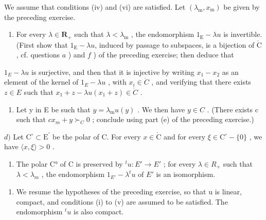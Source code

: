 We assume that conditions (iv) and (vi) are satisfied. Let \((\lambda_{\mathrm{m}}, x_{\mathrm{m}})\) be given by the preceding exercise.

\begin{enumerate}
\def\labelenumi{\alph{enumi})}
\setcounter{enumi}{1}
\tightlist
\item
  For every \(\lambda \in \mathbf{R}_{+}\) such that \(\lambda < \lambda_{\mathrm{m}}\) , the endomorphism \(1_{\mathrm{E}} - \lambda u\) is invertible. (First show that \(1_{\mathrm{E}} - \lambda u\), induced by passage to subspaces, is a bijection of \(\mathring{\mathrm{C}}\) , cf. questions \(a\) ) and \(f\) ) of the preceding exercise; then deduce that
\end{enumerate}

\(1_{E} - \lambda u\) is surjective, and then that it is injective by writing \(x_{1} - x_{2}\) as an element of the kernel of \(1_{E} - \lambda u\) , with \(x_{i} \in \mathring{C}\) , and verifying that there exists \(z \in E\) such that \(x_{1} + z - \lambda u(x_{1} + z) \in \mathring{C}\) .

\begin{enumerate}
\def\labelenumi{\alph{enumi})}
\setcounter{enumi}{2}
\tightlist
\item
  Let y in E be such that \(y = \lambda_{\mathrm{m}} u(y)\) . We then have \(y \in C\) . (There exists c such that \(cx_{m} + y \succ_{C} 0\) ; conclude using part (e) of the preceding exercise.)
\end{enumerate}

\(d)\) Let \(\mathrm{C}^{\circ}\subset\mathrm{E}^{\prime}\) be the polar of C. For every \(x\in\mathring{\mathrm{C}}\) and for every \(\xi\in\mathrm{C}^{\circ}-\{0\}\) , we have \(\langle x,\xi\rangle>0\) .

\begin{enumerate}
\def\labelenumi{\alph{enumi})}
\setcounter{enumi}{4}
\tightlist
\item
  The polar C° of C is preserved by \(^{t}u\colon E'\to E'\) ; for every \(\lambda\in R_{+}\) such that \(\lambda<\lambda_{m}\) , the endomorphism \(1_{E'}-\lambda^{t}u\) of \(E'\) is an isomorphism.
\end{enumerate}

\begin{enumerate}
\def\labelenumi{\arabic{enumi})}
\setcounter{enumi}{29}
\tightlist
\item
  We resume the hypotheses of the preceding exercise, so that u is linear, compact, and conditions (i) to (v) are assumed to be satisfied. The endomorphism \(^{t}u\) is also compact.
\end{enumerate}

